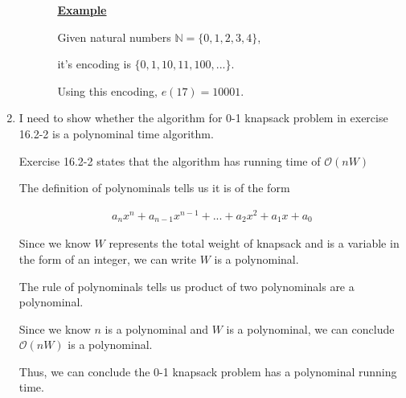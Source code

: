 \documentclass[12pt]{article}
\begin{document}
\begin{enumerate}[1.]
\begin{itemize}
\begin{itemize}
            \bigskip

            \underline{\textbf{Example}}

            \bigskip

            Given natural numbers $\mathbb{N} = \{0,1,2,3,4\}$,

            \bigskip

            it's encoding is $\{0,1,10,11,100, ...\}$.

            \bigskip

            Using this encoding, $e(17) = 10001$.

        \end{itemize}
    \end{itemize}

    \item
    \setcounter{equation}{0}
    \bigskip

    I need to show whether the algorithm for 0-1 knapsack problem in exercise 16.2-2
    is a polynominal time algorithm.

    \bigskip

    Exercise 16.2-2 states that the algorithm has running time of $\mathcal{O}(nW)$

    \bigskip

    The definition of polynominals tells us it is of the form

    \begin{align}
        a_nx^n + a_{n-1}x^{n-1} + ... + a_2x^2 + a_1x + a_0
    \end{align}

    Since we know $W$ represents the total weight of knapsack and is a variable in the form of an integer,
    we can write $W$ is a polynominal.

    \bigskip

    The rule of polynominals tells us product of two polynominals are a polynominal.

    \bigskip

    Since we know $n$ is a polynominal and $W$ is a polynominal,
    we can conclude $\mathcal{O}(nW)$ is a polynominal.

    \bigskip

    Thus, we can conclude the 0-1 knapsack problem has a polynominal running time.

    \bigskip




\end{enumerate}
\end{document}
